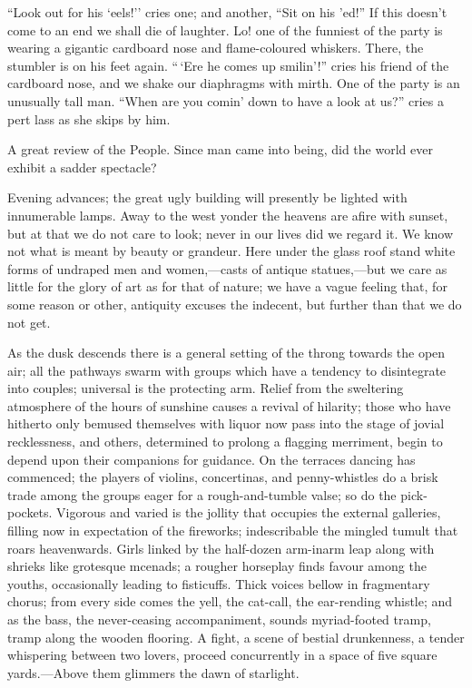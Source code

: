 ``Look out for his `eels!'' cries one; and another, ``Sit on his 'ed!''
If this doesn't come to an end we shall die of laughter. Lo! one of the
funniest of the party is wearing a gigantic cardboard nose and
flame-coloured whiskers. There, the stumbler is on his feet again.
``\,`Ere he comes up smilin'!'' cries his friend of the cardboard nose,
and we shake our diaphragms with mirth. One of the party is an unusually
tall man. ``When are you comin' down to have a look at us?'' cries a
pert lass as she skips by him.

A great review of the People. Since man came into being, did the world
ever exhibit a sadder spectacle?

Evening advances; the great ugly building will presently be lighted with
innumerable lamps. Away to the west yonder the heavens are afire with
sunset, but at that we do not care to look; never in our lives did we
regard it. We know not what is meant by beauty {}or grandeur. Here under
the glass roof stand white forms of undraped men and women,---casts of
antique statues,---but we care as little for the glory of art as for
that of nature; we have a vague feeling that, for some reason or other,
antiquity excuses the indecent, but further than that we do not get.

As the dusk descends there is a general setting of the throng towards
the open air; all the pathways swarm with groups which have a tendency
to disintegrate into couples; universal is the protecting arm. Relief
from the sweltering atmosphere of the hours of sunshine causes a revival
of hilarity; those who have hitherto only bemused themselves with liquor
now pass into the stage of jovial recklessness, and others, determined
to prolong a flagging merriment, begin to depend upon their companions
for guidance. On the terraces dancing has commenced; the players of
violins, concertinas, and penny-whistles do a brisk trade among the
groups eager for a rough-and-tumble valse; so do the {}pick-pockets.
Vigorous and varied is the jollity that occupies the external galleries,
filling now in expectation of the fireworks; indescribable the mingled
tumult that roars heavenwards. Girls linked by the half-dozen arm-inarm
leap along with shrieks like grotesque mcenads; a rougher horseplay
finds favour among the youths, occasionally leading to fisticuffs. Thick
voices bellow in fragmentary chorus; from every side comes the yell, the
cat-call, the ear-rending whistle; and as the bass, the never-ceasing
accompaniment, sounds myriad-footed tramp, tramp along the wooden
flooring. A fight, a scene of bestial drunkenness, a tender whispering
between two lovers, proceed concurrently in a space of five square
yards.---Above them glimmers the dawn of starlight.

